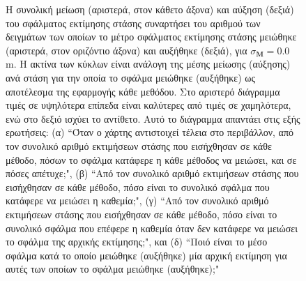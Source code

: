 \begin{figure}\vspace{3cm}%
  
  \vspace{1cm}
  \caption{\small Η συνολική μείωση (αριστερά, στον κάθετο άξονα) και αύξηση
           (δεξιά) του σφάλματος εκτίμησης στάσης συναρτήσει του αριθμού των
           δειγμάτων των οποίων το μέτρο σφάλματος εκτίμησης στάσης μειώθηκε
           (αριστερά, στον οριζόντιο άξονα) και αυξήθηκε (δεξιά), για
           $\sigma_{\bm{M}} = 0.0$ m. Η ακτίνα των κύκλων είναι ανάλογη της
           μέσης μείωσης (αύξησης) ανά στάση για την οποία το σφάλμα μειώθηκε
           (αυξήθηκε) ως αποτέλεσμα της εφαρμογής κάθε μεθόδου. Στο αριστερό
           διάγραμμα τιμές σε υψηλότερα επίπεδα είναι καλύτερες από τιμές σε
           χαμηλότερα, ενώ στο δεξιό ισχύει το αντίθετο. Αυτό το
           διάγραμμα απαντάει στις εξής ερωτήσεις: (α) ``Όταν ο χάρτης
           αντιστοιχεί τέλεια στο περιβάλλον, από τον συνολικό αριθμό
           εκτιμήσεων στάσης που εισήχθησαν σε κάθε μέθοδο, πόσων το σφάλμα
           κατάφερε η κάθε μέθοδος να μειώσει, και σε πόσες απέτυχε;", (β)
           ``Από τον συνολικό αριθμό εκτιμήσεων στάσης που εισήχθησαν σε κάθε
           μέθοδο, πόσο είναι το συνολικό σφάλμα που κατάφερε να μειώσει η
           καθεμία;", (γ) ``Από τον συνολικό αριθμό εκτιμήσεων στάσης που
           εισήχθησαν σε κάθε μέθοδο, πόσο είναι το συνολικό σφάλμα που επέφερε
           η καθεμία όταν δεν κατάφερε να μειώσει το σφάλμα της αρχικής
           εκτίμησης;", και (δ) ``Ποιό είναι το μέσο σφάλμα κατά το οποίο
           μειώθηκε (αυξήθηκε) μία αρχική εκτίμηση για αυτές των οποίων το
           σφάλμα μειώθηκε (αυξήθηκε);"}
  \label{fig:02_04_05:01_circles_sm0}
\end{figure}

